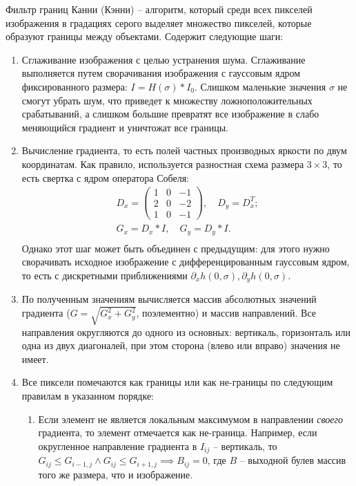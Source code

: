 
Фильтр границ Канни (Кэнни) -- алгоритм, который среди всех пикселей изображения в градациях серого выделяет множество пикселей, которые образуют границы между объектами. Содержит следующие шаги:
\begin{enumerate}
\item
    Сглаживание изображения с целью устранения шума. Сглаживание выполняется путем сворачивания изображения с гауссовым ядром фиксированного размера: $I = H(\sigma) * I_0$. Слишком маленькие значения $\sigma$ не смогут убрать шум, что приведет к множеству ложноположительных срабатываний, а слишком большие превратят все изображение в слабо меняющийся градиент и уничтожат все границы.
\item
    Вычисление градиента, то есть полей частных производных яркости по двум координатам. Как правило, используется разностная схема размера $3 \times 3$, то есть свертка с ядром оператора Собеля:
    \begin{gather*}
        D_x = \begin{pmatrix}
            1 & 0 & -1\\
            2 & 0 & -2\\
            1 & 0 & -1
        \end{pmatrix},
        \quad
        D_y = D_x^T;\\
        G_x = D_x * I, \quad G_y = D_y * I. \\
    \end{gather*}
    Однако этот шаг может быть объединен с предыдущим: для этого нужно сворачивать исходное изображение с дифференцированным гауссовым ядром, то есть с дискретными приближениями $\partial_x h(0, \sigma), \partial_y h(0, \sigma)$.
\item
    По полученным значениям вычисляется массив абсолютных значений градиента ($G = \sqrt{G_x^2 + G_y^2}$, поэлементно) и массив направлений. Все направления округляются до одного из основных: вертикаль, горизонталь или одна из двух диагоналей, при этом сторона (влево или вправо) значения не имеет.
\item
    Все пиксели помечаются как границы или как не-границы по следующим правилам в указанном порядке:
    \begin{enumerate}
    \item
        Если элемент не является локальным максимумом в направлении \textit{своего} градиента, то элемент отмечается как не-граница. Например, если округленное направление градиента в $I_{ij}$ -- вертикаль, то $G_{ij} \le G_{i-1,j} \wedge G_{ij} \le G_{i+1,j} \implies B_{ij} = 0$, где $B$ -- выходной булев массив того же размера, что и изображение.

\end{enumerate}
\end{enumerate}
